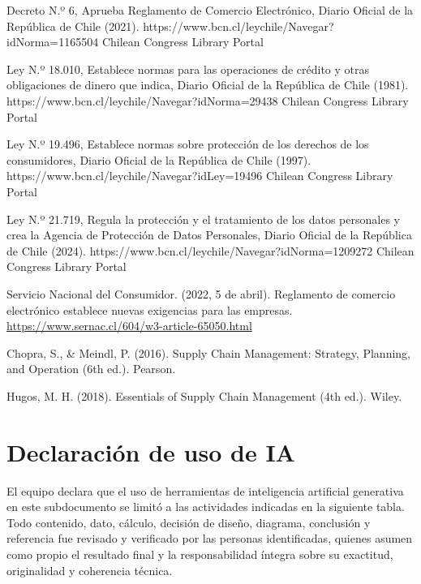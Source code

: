 \documentclass[11pt]{article}
\begin{document}
Decreto N.º 6, Aprueba Reglamento de Comercio Electrónico, Diario Oficial de la República de Chile (2021). https://www.bcn.cl/leychile/Navegar?idNorma=1165504 Chilean Congress Library Portal

Ley N.º 18.010, Establece normas para las operaciones de crédito y otras obligaciones de dinero que indica, Diario Oficial de la República de Chile (1981). https://www.bcn.cl/leychile/Navegar?idNorma=29438 Chilean Congress Library Portal

Ley N.º 19.496, Establece normas sobre protección de los derechos de los consumidores, Diario Oficial de la República de Chile (1997). https://www.bcn.cl/leychile/Navegar?idLey=19496 Chilean Congress Library Portal

Ley N.º 21.719, Regula la protección y el tratamiento de los datos personales y crea la Agencia de Protección de Datos Personales, Diario Oficial de la República de Chile (2024). https://www.bcn.cl/leychile/Navegar?idNorma=1209272 Chilean Congress Library Portal

Servicio Nacional del Consumidor. (2022, 5 de abril). Reglamento de comercio electrónico establece nuevas exigencias para las empresas. \href{https://www.google.com/url?q=https://www.sernac.cl/604/w3-article-65050.html&sa=D&source=editors&ust=1791319645255703&usg=AOvVaw0nijDOXQAhOKmAzTsIYO-s}{https://www.sernac.cl/604/w3-article-65050.html}

Chopra, S., \& Meindl, P. (2016). Supply Chain Management: Strategy, Planning, and Operation (6th ed.). Pearson.

Hugos, M. H. (2018). Essentials of Supply Chain Management (4th ed.). Wiley.

\section*{Declaración de uso de IA}

El equipo declara que el uso de herramientas de inteligencia artificial generativa en este subdocumento se limitó a las actividades indicadas en la siguiente tabla. Todo contenido, dato, cálculo, decisión de diseño, diagrama, conclusión y referencia fue revisado y verificado por las personas identificadas, quienes asumen como propio el resultado final y la responsabilidad íntegra sobre su exactitud, originalidad y coherencia técnica.
\end{document}
